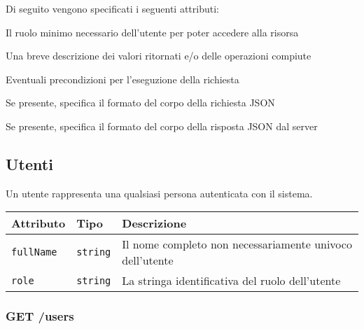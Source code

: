 \documentclass[12pt,a4paper]{article}
\begin{document}
			Di seguito vengono specificati i seguenti attributi:

			\begin{description}[style=multiline,leftmargin=3cm]
			    \item[Ruolo minimo:] Il ruolo minimo necessario dell'utente per poter accedere
			        alla risorsa
			    \item[Descrizione:] Una breve descrizione dei valori ritornati e/o delle
			        operazioni compiute
			    \item[Precondizioni:] Eventuali precondizioni per l'eseguzione della richiesta
			    \item[Argomenti:] Se presente, specifica il formato del corpo
			        della richiesta JSON
			    \item[Attributi:] Se presente, specifica il formato del corpo
			        della risposta JSON dal server
			\end{description}

	\subsection{Utenti}

		Un utente rappresenta una qualsiasi persona autenticata con il sistema.

        \begin{center}
            \begin{tabular}{ | l | l | l | } 
            \hline
                Attributo & Tipo & Descrizione \\
            \hline
                \texttt{fullName} & \texttt{string} & 
                    Il nome completo non necessariamente univoco dell'utente \\
                \texttt{role} & \texttt{string} & 
                    La stringa identificativa del ruolo dell'utente \\
            \hline
            \end{tabular}
        \end{center}

        \subsubsection{GET /users}
\end{document}
